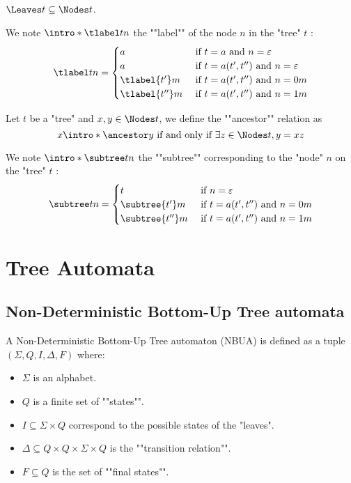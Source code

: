 \documentclass{article}
\begin{document}
\begin{remark}
	$\Leaves t \subseteq \Nodes t$.
\end{remark}

\begin{definition}
	We note $\intro* \tlabel t n$ the ""label"" of the node $n$ in the "tree" $t$ :
	\[
		\tlabel t n =   \begin{cases}
			a               & \text{ if } t = a \text{ and } n = \varepsilon         \\
			a               & \text{ if } t = a(t',t'') \text{ and } n = \varepsilon \\
			\tlabel {t'} m  & \text{ if } t = a(t',t'') \text{ and } n = 0m          \\
			\tlabel {t''} m & \text{ if } t = a(t',t'') \text{ and } n = 1m
		\end{cases}
	\]
\end{definition}

\begin{definition}
	Let $t$ be a "tree" and $x, y \in \Nodes t$, we define the ""ancestor"" relation as
	\[  x \intro* \ancestor y \tiff \exists z \in \Nodes t, y = xz \]
\end{definition}


\begin{definition}
	We note $\intro* \subtree t n$ the ""subtree"" corresponding to the "node" $n$ on the "tree" $t$ :
	\[
		\subtree t n =   \begin{cases}
			t                & \text{ if }  n = \varepsilon                  \\
			\subtree {t'} m  & \text{ if } t = a(t',t'') \text{ and } n = 0m \\
			\subtree {t''} m & \text{ if } t = a(t',t'') \text{ and } n = 1m
		\end{cases}
	\]
\end{definition}


\section{Tree Automata}
\subsection{Non-Deterministic Bottom-Up Tree automata}

\begin{definition}
	A Non-Deterministic Bottom-Up Tree automaton (NBUA) is defined as a tuple
	$(\Sigma, Q, I, \Delta, F)$ where:
	\begin{itemize}
		\item $\Sigma$ is an alphabet.
		\item $Q$ is a finite set of ""states"".
		\item $I \subseteq \Sigma \times Q$ correspond to the possible states of the "leaves".
		\item $\Delta \subseteq Q \times Q \times \Sigma \times Q$ is the ""transition relation"".
		\item $F \subseteq Q$ is the set of ""final states"".
	\end{itemize}
\end{definition}
\end{document}
